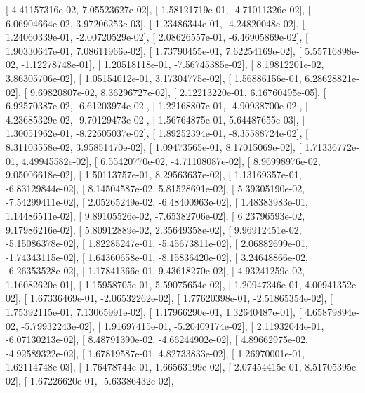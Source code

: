 \documentclass{article}
\begin{document}
       [  4.41157316e-02,   7.05523627e-02],
       [  1.58121719e-01,  -4.71011326e-02],
       [  6.06904664e-02,   3.97206253e-03],
       [  1.23486344e-01,  -4.24820048e-02],
       [  1.24060339e-01,  -2.00720529e-02],
       [  2.08626557e-01,  -6.46905869e-02],
       [  1.90330647e-01,   7.08611966e-02],
       [  1.73790455e-01,   7.62254169e-02],
       [  5.55716898e-02,  -1.12278748e-01],
       [  1.20518118e-01,  -7.56745385e-02],
       [  8.19812201e-02,   3.86305706e-02],
       [  1.05154012e-01,   3.17304775e-02],
       [  1.56886156e-01,   6.28628821e-02],
       [  9.69820807e-02,   8.36296727e-02],
       [  2.12213220e-01,   6.16760495e-05],
       [  6.92570387e-02,  -6.61203974e-02],
       [  1.22168807e-01,  -4.90938700e-02],
       [  4.23685329e-02,  -9.70129473e-02],
       [  1.56764875e-01,   5.64487655e-03],
       [  1.30051962e-01,  -8.22605037e-02],
       [  1.89252394e-01,  -8.35588724e-02],
       [  8.31103558e-02,   3.95851470e-02],
       [  1.09473565e-01,   8.17015069e-02],
       [  1.71336772e-01,   4.49945582e-02],
       [  6.55420770e-02,  -4.71108087e-02],
       [  8.96998976e-02,   9.05006618e-02],
       [  1.50113757e-01,   8.29563637e-02],
       [  1.13169357e-01,  -6.83129844e-02],
       [  8.14504587e-02,   5.81528691e-02],
       [  5.39305190e-02,  -7.54299411e-02],
       [  2.05265249e-02,  -6.48400963e-02],
       [  1.48383983e-01,   1.14486511e-02],
       [  9.89105526e-02,  -7.65382706e-02],
       [  6.23796593e-02,   9.17986216e-02],
       [  5.80912889e-02,   2.35649358e-02],
       [  9.96912451e-02,  -5.15086378e-02],
       [  1.82285247e-01,  -5.45673811e-02],
       [  2.06882699e-01,  -1.74343115e-02],
       [  1.64360658e-01,  -8.15836420e-02],
       [  3.24648866e-02,  -6.26353528e-02],
       [  1.17841366e-01,   9.43618270e-02],
       [  4.93241259e-02,   1.16082620e-01],
       [  1.15958705e-01,   5.59075654e-02],
       [  1.20947346e-01,   4.00941352e-02],
       [  1.67336469e-01,  -2.06532262e-02],
       [  1.77620398e-01,  -2.51865354e-02],
       [  1.75392115e-01,   7.13065991e-02],
       [  1.17966290e-01,   1.32640487e-01],
       [  4.65879894e-02,  -5.79932243e-02],
       [  1.91697415e-01,  -5.20409174e-02],
       [  2.11932044e-01,  -6.07130213e-02],
       [  8.48791390e-02,  -4.66244902e-02],
       [  4.89662975e-02,  -4.92589322e-02],
       [  1.67819587e-01,   4.82733833e-02],
       [  1.26970001e-01,   1.62114748e-03],
       [  1.76478744e-01,   1.66563199e-02],
       [  2.07454415e-01,   8.51705395e-02],
       [  1.67226620e-01,  -5.63386432e-02],
\end{document}
